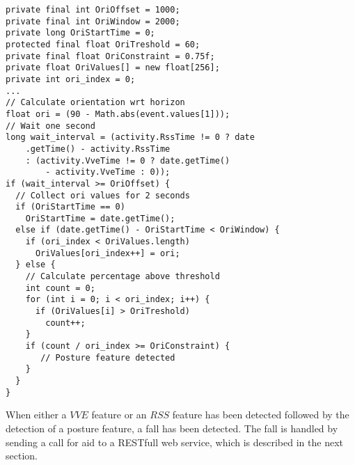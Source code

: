 \documentclass[a4paper, 10pt]{article}
\begin{document}
\begin{lstlisting}
private final int OriOffset = 1000;
private final int OriWindow = 2000;
private long OriStartTime = 0;
protected final float OriTreshold = 60;
private final float OriConstraint = 0.75f;
private float OriValues[] = new float[256];
private int ori_index = 0;
...
// Calculate orientation wrt horizon
float ori = (90 - Math.abs(event.values[1]));
// Wait one second
long wait_interval = (activity.RssTime != 0 ? date
    .getTime() - activity.RssTime
    : (activity.VveTime != 0 ? date.getTime()
        - activity.VveTime : 0));
if (wait_interval >= OriOffset) {
  // Collect ori values for 2 seconds
  if (OriStartTime == 0)
    OriStartTime = date.getTime();
  else if (date.getTime() - OriStartTime < OriWindow) {
    if (ori_index < OriValues.length)
      OriValues[ori_index++] = ori;
  } else {
    // Calculate percentage above threshold
    int count = 0;
    for (int i = 0; i < ori_index; i++) {
      if (OriValues[i] > OriTreshold)
        count++;
    }
    if (count / ori_index >= OriConstraint) {
       // Posture feature detected
    }
  }
}
\end{lstlisting}
When either a $VVE$ feature or an $RSS$ feature has been detected followed by the detection of a posture feature, a fall has been detected. The fall is handled by sending a call for aid to a RESTfull web service, which is described in the next section.

\newpage
\end{document}
